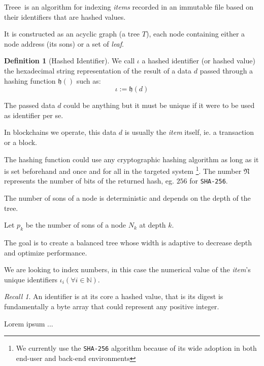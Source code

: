\documentclass[twoside,twocolumn]{article}
\theoremstyle{definition}
\newtheorem{definition}{Definition}
\theoremstyle{remark}
\newtheorem*{recall}{Recall}
\begin{document}
Treee\texttrademark~is an algorithm for indexing \emph{items} recorded in an immutable file based on their identifiers that are hashed values.

It is constructed as an acyclic graph (a tree $T$), each node containing either a node address (its sons) or a set of \emph{leaf}.

\begin{definition}[Hashed Identifier]
    \label{hashedIdentifier}
    We call $\iota$ a hashed identifier (or hashed value) the hexadecimal string representation of the result of a data $d$ passed through a hashing 
    function $\mathfrak{h}()$ such as:
    \begin{equation}
        \label{eq:hashedIdentifier}
        \iota := \mathfrak{h}(d)
    \end{equation}

    The passed data $d$ could be anything but it must be unique if it were to be used as identifier per se.
    
    In blockchains we operate, this data $d$ is usually the \emph{item} itself, ie. a transaction or a block.

    The hashing function could use any cryptographic hashing algorithm as long as it is set beforehand and once and for all in the targeted system
    \footnote{We currently use the \texttt{SHA-256} algorithm because of its wide adoption in both end-user and back-end environments}.
    The number $\mathfrak{N}$ represents the number of bits of the returned hash, eg. $256$ for \texttt{SHA-256}.
\end{definition}

The number of sons of a node is deterministic and depends on the depth of the tree.

Let $p_k$ be the number of sons of a node $N_k$ at depth $k$.

The goal is to create a balanced tree whose width is adaptive to decrease depth and optimize performance.

We are looking to index numbers, in this case the numerical value of the \emph{item}'s unique identifiers $\iota_i (\forall i \in \mathbb{N})$.

\begin{recall}
    An identifier is at its core a hashed value, that is its digest is fundamentally a byte array that could represent any positive integer.
\end{recall}


Lorem ipsum ...

\end{document}
